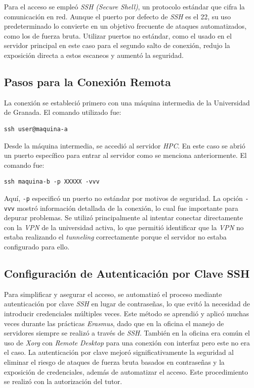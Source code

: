 Para el acceso se empleó \textit{SSH (Secure Shell)}, un protocolo estándar que cifra la comunicación en red. Aunque el puerto por defecto de \textit{SSH} es el 22, su uso predeterminado lo convierte en un objetivo frecuente de ataques automatizados, como los de fuerza bruta. Utilizar puertos no estándar, como el usado en el servidor principal en este caso para el segundo salto de conexión, redujo la exposición directa a estos escaneos y aumentó la seguridad.

\subsection*{Pasos para la Conexión Remota}
La conexión se estableció primero con una máquina intermedia de la Universidad de Granada. El comando utilizado fue:
\begin{verbatim}
ssh user@maquina-a
\end{verbatim}

Desde la máquina intermedia, se accedió al servidor \textit{HPC}. En este caso se abrió un puerto específico para entrar al servidor como se menciona anteriormente. El comando fue:
\begin{verbatim}
ssh maquina-b -p XXXXX -vvv
\end{verbatim}

Aquí, \texttt{-p} especificó un puerto no estándar por motivos de seguridad. La opción \texttt{-vvv} mostró información detallada de la conexión, lo cual fue importante para depurar problemas. Se utilizó principalmente al intentar conectar directamente con la \textit{VPN} de la universidad activa, lo que permitió identificar que la \textit{VPN} no estaba realizando el \textit{tunneling} correctamente porque el servidor no estaba configurado para ello.

\subsection*{Configuración de Autenticación por Clave SSH}
Para simplificar y asegurar el acceso, se automatizó el proceso mediante autenticación por clave \textit{SSH} en lugar de contraseñas, lo que evitó la necesidad de introducir credenciales múltiples veces. Este método se aprendió y aplicó muchas veces durante las prácticas \textit{Erasmus}, dado que en la oficina el manejo de servidores siempre se realizó a través de \textit{SSH}. También en la oficina era común el uso de \textit{Xorg} con \textit{Remote Desktop} para una conexión con interfaz pero este no era el caso. La autenticación por clave mejoró significativamente la seguridad al eliminar el riesgo de ataques de fuerza bruta basados en contraseñas y la exposición de credenciales, además de automatizar el acceso. Este procedimiento se realizó con la autorización del tutor.

